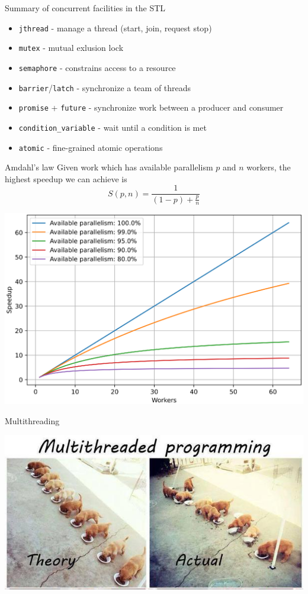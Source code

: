 \documentclass{beamer}
\begin{document}
\begin{frame}{Summary of concurrent facilities in the STL}
\begin{itemize}
\item \texttt{jthread} - manage a thread (start, join, request stop)
\item \texttt{mutex} - mutual exlusion lock
\item \texttt{semaphore} - constrains access to a resource
\item \texttt{barrier}/\texttt{latch} - synchronize a team of threads
\item \texttt{promise} + \texttt{future} - synchronize work between a producer and consumer
\item \texttt{condition\_variable} - wait until a condition is met
\item \texttt{atomic} - fine-grained atomic operations
\end{itemize}
\end{frame}

\begin{frame}{Amdahl's law}
Given work which has available parallelism $p$ and $n$ workers, the highest speedup we can achieve is
\begin{equation*}
S(p,n)=\frac{1}{\left(1 - p\right) + \frac{p}{n}}
\end{equation*}

\begin{center}
\includegraphics[width=.8\textwidth, trim = {1cm, .25cm, 1cm, 1.25cm}, clip]{amdahl.eps}
\end{center}
\end{frame}

\begin{frame}{Multithreading}
\begin{center}
\includegraphics[width=\linewidth]{concurrency.jpeg}
\end{center}
\end{frame}
\end{document}
